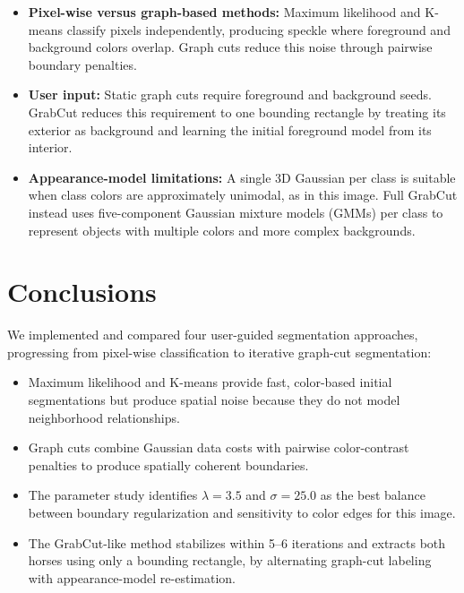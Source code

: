 \documentclass[11pt,a4paper]{article}
\begin{document}
\begin{itemize}
    \item \textbf{Pixel-wise versus graph-based methods:} Maximum likelihood and K-means classify pixels independently, producing speckle where foreground and background colors overlap. Graph cuts reduce this noise through pairwise boundary penalties.
    \item \textbf{User input:} Static graph cuts require foreground and background seeds. GrabCut reduces this requirement to one bounding rectangle by treating its exterior as background and learning the initial foreground model from its interior.
    \item \textbf{Appearance-model limitations:} A single 3D Gaussian per class is suitable when class colors are approximately unimodal, as in this image. Full GrabCut instead uses five-component Gaussian mixture models (GMMs) per class to represent objects with multiple colors and more complex backgrounds.
\end{itemize}

\section{Conclusions}

We implemented and compared four user-guided segmentation approaches, progressing from pixel-wise classification to iterative graph-cut segmentation:

\begin{itemize}
    \item Maximum likelihood and K-means provide fast, color-based initial segmentations but produce spatial noise because they do not model neighborhood relationships.
    \item Graph cuts combine Gaussian data costs with pairwise color-contrast penalties to produce spatially coherent boundaries.
    \item The parameter study identifies $\lambda=3.5$ and $\sigma=25.0$ as the best balance between boundary regularization and sensitivity to color edges for this image.
    \item The GrabCut-like method stabilizes within 5--6 iterations and extracts both horses using only a bounding rectangle, by alternating graph-cut labeling with appearance-model re-estimation.
\end{itemize}
\end{document}
